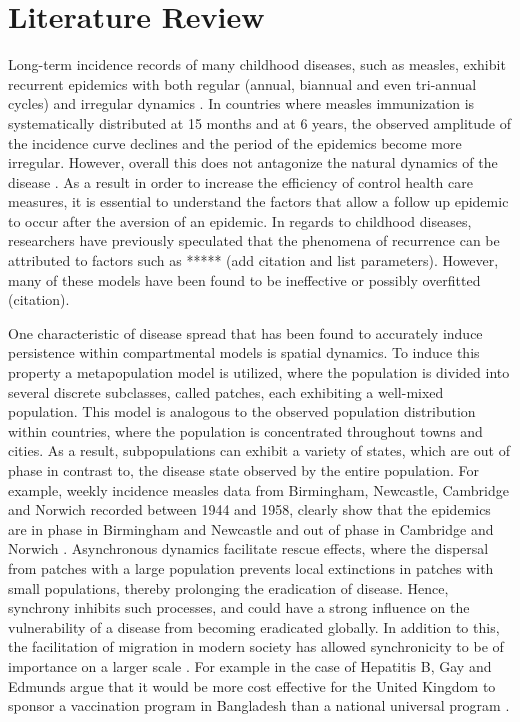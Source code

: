 \documentclass[twocolumn,nofootinbib,showkeys,twoside,floatfix,unsortedaddress,flushbottom,10pt,aps,pra]{report}
\begin{document}
\section{Literature Review }
Long-term incidence records of many childhood diseases, such as measles, exhibit recurrent epidemics with  both regular (annual, biannual and even tri-annual cycles) and irregular dynamics \cite{Earn2000}. In countries where measles immunization is systematically distributed at 15 months and at 6 years, the observed amplitude of the incidence curve declines and the period of the epidemics become more irregular. However, overall this does not antagonize the natural dynamics of the disease \cite{Samanta2014,Earn2000}. As a result in order to increase the efficiency of control health care measures, it is essential to understand the factors that allow a follow up epidemic to occur after the aversion of an epidemic. In regards to childhood diseases, researchers have previously speculated that the phenomena of recurrence can be attributed to factors such as ***** (add citation and list parameters). However, many of these models have been found to be ineffective or possibly overfitted (citation). 
\par
\smallskip \qquad
One characteristic of disease spread that has been found to accurately induce persistence within compartmental models is spatial dynamics. To induce this property a metapopulation model is utilized, where the population is divided into several discrete subclasses, called patches, each exhibiting a well-mixed population. This model is analogous to the observed population distribution within countries, where the population is concentrated throughout towns and cities. As a result, subpopulations can exhibit a variety of states, which are out of phase in contrast to, the disease state observed by the entire population. For example, weekly incidence measles data from Birmingham, Newcastle, Cambridge and Norwich recorded between 1944 and 1958, clearly show that the epidemics are in phase in Birmingham and Newcastle and out of phase in Cambridge and Norwich \cite{Grenfell2001}. Asynchronous dynamics facilitate rescue effects, where the dispersal from patches with a large population prevents local extinctions in patches with small populations, thereby prolonging the eradication of disease. Hence, synchrony inhibits such processes, and could have a strong inﬂuence on the vulnerability of a disease from becoming eradicated globally. In addition to this, the facilitation of migration in modern society has allowed synchronicity to be of importance on a larger scale \cite{McCluskey2011}. For example in the case of Hepatitis B, Gay and Edmunds argue that it would be more cost effective for the United Kingdom to sponsor a vaccination program in Bangladesh than a national universal program \cite{Burton2012}. 
\end{document}
